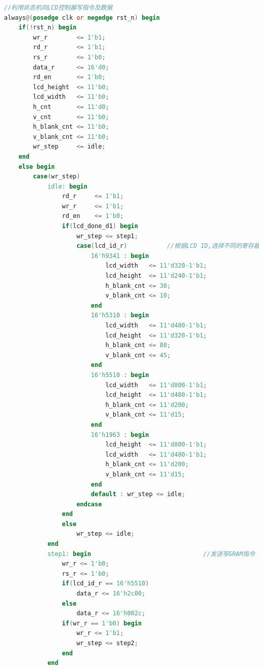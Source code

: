 \documentclass[12pt,hyperref,a4paper,UTF8]{ctexart}
\begin{document}
\begin{lstlisting}[language=Verilog]
//利用状态机向LCD控制器写指令及数据
always@(posedge clk or negedge rst_n) begin
    if(!rst_n) begin
        wr_r        <= 1'b1;
        rd_r        <= 1'b1;
        rs_r        <= 1'b0;
        data_r      <= 16'd0;           
        rd_en       <= 1'b0;
        lcd_height  <= 11'b0;
        lcd_width   <= 11'b0;
        h_cnt       <= 11'd0;
        v_cnt       <= 11'b0;
        h_blank_cnt <= 11'b0;
        v_blank_cnt <= 11'b0;
        wr_step     <= idle;
    end
    else begin
        case(wr_step)      
            idle: begin
                rd_r     <= 1'b1; 
                wr_r     <= 1'b1;
                rd_en    <= 1'b0;   
                if(lcd_done_d1) begin   
                    wr_step <= step1; 
                    case(lcd_id_r)           //根据LCD ID,选择不同的寄存器指令与分辨率
                        16'h9341 : begin
                            lcd_width   <= 11'd320-1'b1;
                            lcd_height  <= 11'd240-1'b1;
                            h_blank_cnt <= 30;
                            v_blank_cnt <= 10;
                        end    
                        16'h5310 : begin
                            lcd_width   <= 11'd480-1'b1;
                            lcd_height  <= 11'd320-1'b1;
                            h_blank_cnt <= 80;
                            v_blank_cnt <= 45;
                        end    
                        16'h5510 : begin
                            lcd_width   <= 11'd800-1'b1;
                            lcd_height  <= 11'd480-1'b1;
                            h_blank_cnt <= 11'd200;
                            v_blank_cnt <= 11'd15;
                        end                      
                        16'h1963 : begin
                            lcd_height  <= 11'd800-1'b1;
                            lcd_width   <= 11'd480-1'b1;
                            h_blank_cnt <= 11'd200;
                            v_blank_cnt <= 11'd15;
                        end       
                        default : wr_step <= idle;
                    endcase     
                end 
                else
                    wr_step <= idle;
            end
            step1: begin                               //发送写GRAM指令
                wr_r <= 1'b0;
                rs_r <= 1'b0;    
                if(lcd_id_r == 16'h5510)
                    data_r <= 16'h2c00;              
                else
                    data_r <= 16'h002c;    
                if(wr_r == 1'b0) begin
                    wr_r <= 1'b1;
                    wr_step <= step2;
                end
            end

\end{lstlisting}
\end{document}
